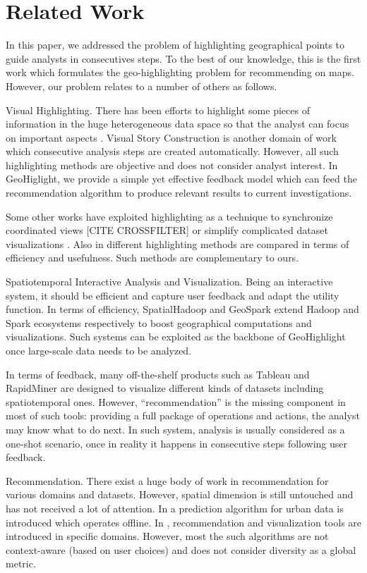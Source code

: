 \section{Related Work}\label{sec:related-works}

In this paper, we addressed the problem of highlighting geographical points to
guide analysts in consecutives steps. To the best of our knowledge, this is the
first work which formulates the geo-highlighting problem for recommending on
maps. However, our problem relates to a number of others as follows.     

Visual Highlighting. There has been efforts to highlight some pieces of
information in the huge heterogeneous data space so that the analyst can focus
on important aspects \cite{Liang2010,Lohmann:2012,Robinson2011}. Visual
Story Construction is another domain of work \cite{Segel:2010,Samet:2014} which
consecutive analysis steps are created automatically. However, all such highlighting methods are objective and does not consider analyst
interest. In GeoHiglight, we provide a simple yet effective feedback model which
can feed the recommendation algorithm to produce relevant results to current
investigations.        

Some other works have exploited highlighting as a technique to synchronize
coordinated views [CITE CROSSFILTER] or simplify complicated dataset
visualizations \cite{Robinson2011,Alper:2011}. Also in \cite{Philipsen}
different highlighting methods are compared in terms of efficiency and usefulness. Such methods are complementary to ours.     

Spatiotemporal Interactive Analysis and Visualization. Being an interactive
system, it should be efficient and capture user feedback and adapt the utility
function. In terms of efficiency, SpatialHadoop \cite{} and GeoSpark \cite{}
extend Hadoop and Spark ecosystems respectively to boost geographical
computations and visualizations. Such systems can be exploited as the backbone
of GeoHighlight once large-scale data needs to be analyzed.      

In terms of feedback, many off-the-shelf products such as Tableau \cite{} and
RapidMiner \cite{} are designed to visualize different kinds of datasets including
spatiotemporal ones. However, ``recommendation'' is the missing component in
most of such tools: providing a full package of operations and actions, the analyst
may know what to do next. In such system, analysis is usually considered as a
one-shot scenario, once in reality it happens in consecutive steps following
user feedback.        

Recommendation. There exist a huge body of work in recommendation
\cite{Adomavicius:2005} for various domains and datasets. However, spatial
dimension is still untouched and has not received a lot of attention. In
\cite{ChirigatiDDF16} a prediction algorithm for urban data is introduced which operates offline. In
\cite{Levandoski:2012,Magdy2014,HendawiKRBTA15a,Bao2015,Magdy:2014},
recommendation and visualization tools are introduced in specific domains.
However, most the such algorithms are not context-aware (based on user choices)
and does not consider diversity as a global metric.    
